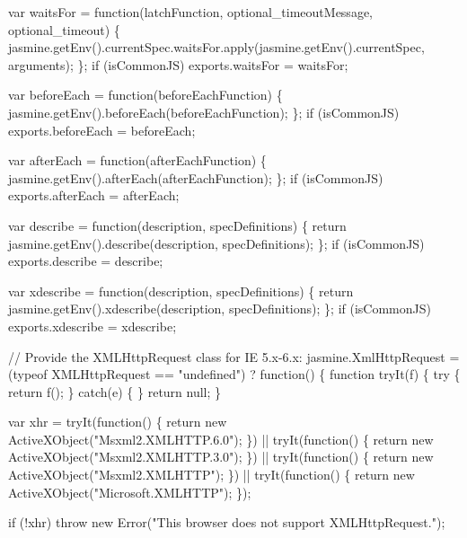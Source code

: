 \begin{DoxyCodeInclude}
var waitsFor = \textcolor{keyword}{function}(latchFunction, optional\_timeoutMessage, optional\_timeout) \{
  jasmine.getEnv().currentSpec.waitsFor.apply(jasmine.getEnv().currentSpec, arguments);
\};
\textcolor{keywordflow}{if} (isCommonJS) exports.waitsFor = waitsFor;

var beforeEach = \textcolor{keyword}{function}(beforeEachFunction) \{
  jasmine.getEnv().beforeEach(beforeEachFunction);
\};
\textcolor{keywordflow}{if} (isCommonJS) exports.beforeEach = beforeEach;

var afterEach = \textcolor{keyword}{function}(afterEachFunction) \{
  jasmine.getEnv().afterEach(afterEachFunction);
\};
\textcolor{keywordflow}{if} (isCommonJS) exports.afterEach = afterEach;

var describe = \textcolor{keyword}{function}(description, specDefinitions) \{
  \textcolor{keywordflow}{return} jasmine.getEnv().describe(description, specDefinitions);
\};
\textcolor{keywordflow}{if} (isCommonJS) exports.describe = describe;

var xdescribe = \textcolor{keyword}{function}(description, specDefinitions) \{
  \textcolor{keywordflow}{return} jasmine.getEnv().xdescribe(description, specDefinitions);
\};
\textcolor{keywordflow}{if} (isCommonJS) exports.xdescribe = xdescribe;


\textcolor{comment}{// Provide the XMLHttpRequest class for IE 5.x-6.x:}
jasmine.XmlHttpRequest = (typeof XMLHttpRequest == \textcolor{stringliteral}{"undefined"}) ? \textcolor{keyword}{function}() \{
  \textcolor{keyword}{function} tryIt(f) \{
    \textcolor{keywordflow}{try} \{
      \textcolor{keywordflow}{return} f();
    \} \textcolor{keywordflow}{catch}(e) \{
    \}
    \textcolor{keywordflow}{return} null;
  \}

  var xhr = tryIt(\textcolor{keyword}{function}() \{
    \textcolor{keywordflow}{return} \textcolor{keyword}{new} ActiveXObject(\textcolor{stringliteral}{"Msxml2.XMLHTTP.6.0"});
  \}) ||
    tryIt(\textcolor{keyword}{function}() \{
      \textcolor{keywordflow}{return} \textcolor{keyword}{new} ActiveXObject(\textcolor{stringliteral}{"Msxml2.XMLHTTP.3.0"});
    \}) ||
    tryIt(\textcolor{keyword}{function}() \{
      \textcolor{keywordflow}{return} \textcolor{keyword}{new} ActiveXObject(\textcolor{stringliteral}{"Msxml2.XMLHTTP"});
    \}) ||
    tryIt(\textcolor{keyword}{function}() \{
      \textcolor{keywordflow}{return} \textcolor{keyword}{new} ActiveXObject(\textcolor{stringliteral}{"Microsoft.XMLHTTP"});
    \});

  \textcolor{keywordflow}{if} (!xhr) \textcolor{keywordflow}{throw} \textcolor{keyword}{new} Error(\textcolor{stringliteral}{"This browser does not support XMLHttpRequest."});


\end{DoxyCodeInclude}
